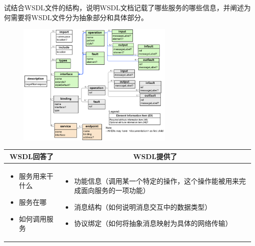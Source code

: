 \begin{problem}
试结合WSDL文件的结构，说明WSDL文档记载了哪些服务的哪些信息，并阐述为何需要将WSDL文件分为抽象部分和具体部分。
\end{problem}

\begin{solution}
\begin{figure}[H]
    \vspace{-0.5em}
	\centering
	\includegraphics[width=0.68\textwidth]{WSDL 2.0信息集结构.png}
    \vspace{-1em}
\end{figure}

\vspace{-0.5em}
\begin{spacing}{1.2}
    \begin{longtable}{|m{4cm}|m{9cm}|}
        \hline
        \multicolumn{1}{|c|}{WSDL回答了}  &  \multicolumn{1}{c|}{WSDL提供了}\\ \hline
        \vspace{-1.3em}
        \begin{itemize}[leftmargin=1.5em,itemsep=-2pt]
            \item 服务用来干什么
            \item 服务在哪
            \item 如何调用服务
            \vspace{-1.5em}
        \end{itemize} &  
        \vspace{-1.3em}
        \begin{itemize}[leftmargin=1.5em,itemsep=-2pt]
            \item 功能信息（调用某一个特定的操作，这个操作能被用来完成面向服务的一项功能）
            \item 消息结构（如何说明消息交互中的数据类型）
            \item 协议绑定（如何将抽象消息映射为具体的网络传输）
            \vspace{-1.5em}
        \end{itemize}
        \\\hline
    \end{longtable}
\end{spacing}
\vspace{-1em}


\end{solution}
